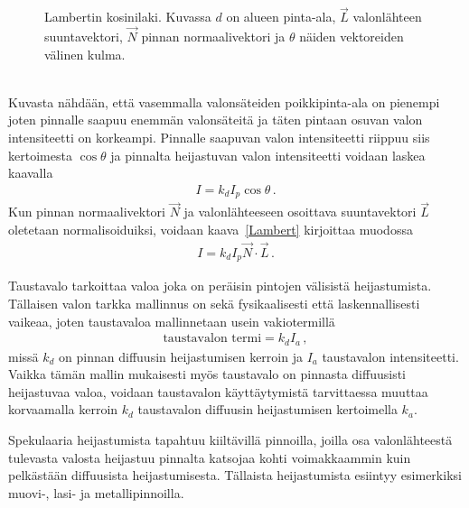 \documentclass[finnish]{tktltiki2}
\theoremstyle{definition}
\theoremstyle{remark}
\begin{document}
\begin{figure}[h]
\caption{Lambertin kosinilaki. Kuvassa $d$ on alueen pinta-ala, $\vec{L}$ valonlähteen suuntavektori, $\vec{N}$ pinnan normaalivektori ja $\theta$ näiden vektoreiden välinen kulma.}
\label{fig:Lambertin_laki}
\end{figure}\\
Kuvasta nähdään, että vasemmalla valonsäteiden poikkipinta-ala on pienempi joten pinnalle saapuu enemmän valonsäteitä ja täten pintaan osuvan valon intensiteetti on korkeampi. Pinnalle saapuvan valon intensiteetti riippuu siis kertoimesta $\cos\theta$ ja pinnalta heijastuvan valon intensiteetti voidaan laskea kaavalla
\begin{align}
\label{Lambert}
I = k_dI_p\cos\theta\,.
\end{align}
Kun pinnan normaalivektori $\vec{N}$ ja valonlähteeseen osoittava suuntavektori $\vec{L}$ oletetaan normalisoiduiksi, voidaan kaava~\ref{Lambert} kirjoittaa muodossa
\begin{align*}
I = k_dI_p\vec{N}\cdot\vec{L}\,.
\end{align*}

Taustavalo tarkoittaa valoa joka on peräisin pintojen välisistä heijastumista. Tällaisen valon tarkka mallinnus on sekä fysikaalisesti että laskennallisesti vaikeaa, joten taustavaloa mallinnetaan  usein vakiotermillä
\begin{align*}
\text{taustavalon termi} = k_dI_a\,,
\end{align*}
missä $k_d$ on pinnan diffuusin heijastumisen kerroin ja $I_a$ taustavalon intensiteetti. Vaikka tämän mallin mukaisesti myös taustavalo on pinnasta diffuusisti heijastuvaa valoa, voidaan taustavalon käyttäytymistä tarvittaessa muuttaa korvaamalla kerroin $k_d$ taustavalon diffuusin heijastumisen kertoimella $k_a$.

Spekulaaria heijastumista tapahtuu kiiltävillä pinnoilla, joilla osa valonlähteestä tulevasta valosta heijastuu pinnalta katsojaa kohti voimakkaammin kuin pelkästään diffuusista heijastumisesta. Tällaista heijastumista esiintyy esimerkiksi muovi-, lasi- ja metallipinnoilla.
\end{document}
